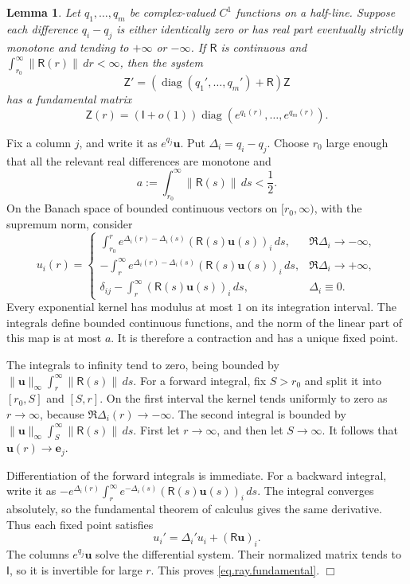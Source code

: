 \documentclass[a4paper,12pt]{article}
\newtheorem{lemma}[defin]{Lemma}
\newenvironment{proof}
{\noindent{\it Proof.}}{\hfill $\Box$\par\vspace{2.5mm}}
\numberwithin{equation}{section}
\begin{document}
\begin{lemma}\label{lem.stein.modify}
Let $q_1,\ldots,q_m$ be complex-valued $C^1$ functions on a half-line.
Suppose each difference $q_i-q_j$ is either identically zero or has
real part eventually strictly monotone and tending to $+\infty$ or $-\infty$.
If $\mathsf{R}$ is continuous and
$\int_{r_0}^\infty\|\mathsf{R}(r)\|\,dr<\infty$, then the system
\[
 \mathsf{Z}'=(\operatorname{diag}(q_1',\ldots,q_m')+\mathsf{R})\mathsf{Z}
\]
has a fundamental matrix
\begin{equation}\label{eq.ray.fundamental}
 \mathsf{Z}(r)=(\mathsf{I}+o(1))\operatorname{diag}(e^{q_1(r)},\ldots,e^{q_m(r)}).
\end{equation}
\end{lemma}
\begin{proof}
Fix a column $j$, and write it as $e^{q_j}\bm u$.
Put $\Delta_i=q_i-q_j$. Choose $r_0$ large enough that all the relevant
real differences are monotone and
\[
 a:=\int_{r_0}^\infty\|\mathsf{R}(s)\|\,ds<\frac12.
\]
On the Banach space of bounded continuous vectors on $[r_0,\infty)$,
with the supremum norm, consider
\begin{equation}\label{eq.ray.integral}
 u_i(r)=
 \begin{cases}
 \displaystyle\int_{r_0}^r e^{\Delta_i(r)-\Delta_i(s)}
                (\mathsf{R}(s)\bm u(s))_i\,ds,
       &\Re\Delta_i\to-\infty,\\[6pt]
 \displaystyle-\int_r^\infty e^{\Delta_i(r)-\Delta_i(s)}
                (\mathsf{R}(s)\bm u(s))_i\,ds,
       &\Re\Delta_i\to+\infty,\\[6pt]
 \displaystyle\delta_{ij}-\int_r^\infty(\mathsf{R}(s)\bm u(s))_i\,ds,
       &\Delta_i\equiv0.
 \end{cases}
\end{equation}
Every exponential kernel has modulus at most $1$ on its integration interval.
The integrals define bounded continuous functions, and the norm of the
linear part of this map is at most $a$. It is therefore a contraction
and has a unique fixed point.

The integrals to infinity tend to zero, being bounded by
$\|\bm u\|_\infty\int_r^\infty\|\mathsf{R}(s)\|\,ds$.
For a forward integral, fix $S>r_0$ and split it into $[r_0,S]$ and $[S,r]$.
On the first interval the kernel tends uniformly to zero as $r\to\infty$,
because $\Re\Delta_i(r)\to-\infty$.
The second integral is bounded by
$\|\bm u\|_\infty\int_S^\infty\|\mathsf{R}(s)\|\,ds$.
First let $r\to\infty$, and then let $S\to\infty$.
It follows that $\bm u(r)\to\bm e_j$.

Differentiation of the forward integrals is immediate.
For a backward integral, write it as
$-e^{\Delta_i(r)}\int_r^\infty
e^{-\Delta_i(s)}(\mathsf{R}(s)\bm u(s))_i\,ds$.
The integral converges absolutely, so the fundamental theorem of calculus
gives the same derivative. Thus each fixed point satisfies
\[
 u_i'=\Delta_i'u_i+(\mathsf{R}\bm u)_i.
\]
The columns $e^{q_j}\bm u$ solve the differential system.
Their normalized matrix tends to $\mathsf{I}$, so it is invertible for large $r$.
This proves \eqref{eq.ray.fundamental}.
\end{proof}
\end{document}
